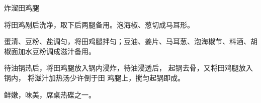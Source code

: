 \begin{recipe}{炸溜田鸡腿}

\ingredients


\cooking

\step 将田鸡剐后洗净，取下后两腿备用。泡海椒、葱切成马耳形。

\step 蛋清、豆粉、盐调匀，将田鸡腿拌匀；豆油、姜片、马耳葱、泡海椒节、料酒、胡
椒面加水豆粉调成滋汁备用。

待油锅热后，将田鸡腿放入锅内浸炸，待油浸透后， 起锅去骨，又将田鸡腿放入锅内，
将滋汁加热汤少许倒于田 鸡腿上，搅匀起锅即成。

\notes

鲜嫩，味美，席桌热碟之一。

\end{recipe}


